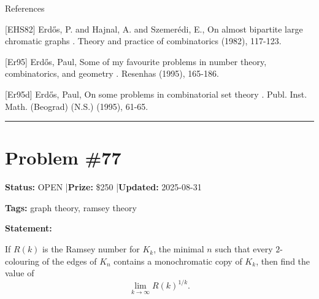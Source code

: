 \documentclass{article}
\begin{document}
References

[EHS82] Erd\H{o}s, P. and Hajnal, A. and Szemer\'{e}di, E., On almost bipartite large chromatic graphs . Theory and practice of combinatorics (1982), 117-123.

[Er95] Erd\H{o}s, Paul, Some of my favourite problems in number theory, combinatorics, and geometry . Resenhas (1995), 165-186.

[Er95d] Erd\H{o}s, Paul, On some problems in combinatorial set theory . Publ. Inst. Math. (Beograd) (N.S.) (1995), 61-65.

\noindent\rule{\linewidth}{0.4pt}


\section{Problem \#77}
\label{prob:77}

\noindent\textbf{Status:} OPEN \quad|\quad \textbf{Prize:} \$250 \quad|\quad \textbf{Updated:} 2025-08-31

\noindent\textbf{Tags:} graph theory, ramsey theory

\medskip

\noindent\textbf{Statement:}

If $R(k)$ is the Ramsey number for $K_k$, the minimal $n$ such that every $2$-colouring of the edges of $K_n$ contains a monochromatic copy of $K_k$, then find the value of\[\lim_{k\to \infty}R(k)^{1/k}.\]
\end{document}
